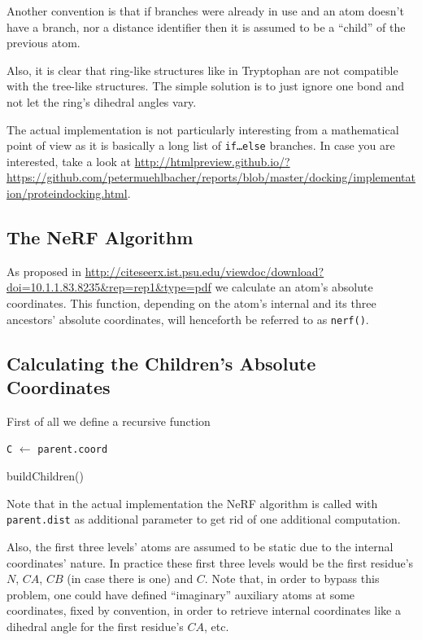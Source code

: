 Another convention is that if branches were already in use and an atom doesn't have a branch, nor a distance identifier then it is assumed to be a ``child'' of the previous atom.

Also, it is clear that ring-like structures like in Tryptophan are not compatible with the tree-like structures. The simple solution is to just ignore one bond and not let the ring's dihedral angles vary.

The actual implementation is not particularly interesting from a mathematical point of view as it is basically a long list of \texttt{if\dots else} branches. In case you are interested, take a look at \url{http://htmlpreview.github.io/?https://github.com/petermuehlbacher/reports/blob/master/docking/implementation/proteindocking.html}.

\subsection{The NeRF Algorithm}

As proposed in \url{http://citeseerx.ist.psu.edu/viewdoc/download?doi=10.1.1.83.8235&rep=rep1&type=pdf} we calculate an atom's absolute coordinates. This function, depending on the atom's  internal and its three ancestors' absolute coordinates, will henceforth be referred to as \texttt{nerf()}.

\subsection{Calculating the Children's Absolute Coordinates}

First of all we define a recursive function 

\begin{algorithm}[H]
 
 	\texttt{C} $\leftarrow$ \texttt{parent.coord}\;
	\caption{buildChildren()}
\end{algorithm}

Note that in the actual implementation the NeRF algorithm is called with \texttt{parent.dist} as additional parameter to get rid of one additional computation.

Also, the first three levels' atoms are assumed to be static due to the internal coordinates' nature. In practice these first three levels would be the first residue's $N$, $CA$, $CB$ (in case there is one) and $C$.
Note that, in order to bypass this problem, one could have defined ``imaginary'' auxiliary atoms at some coordinates, fixed by convention, in order to retrieve internal coordinates like a dihedral angle for the first residue's $CA$, etc.





